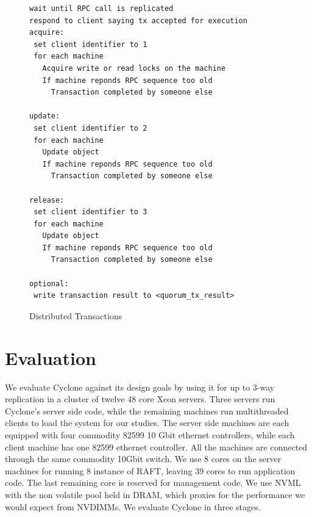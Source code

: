 \documentclass[letterpaper,twocolumn,10pt]{article}
\begin{document}
\begin{figure}
{ \scriptsize
\begin{verbatim}
wait until RPC call is replicated
respond to client saying tx accepted for execution
acquire:
 set client identifier to 1
 for each machine
   Acquire write or read locks on the machine
   If machine reponds RPC sequence too old
     Transaction completed by someone else

update:
 set client identifier to 2
 for each machine
   Update object
   If machine reponds RPC sequence too old
     Transaction completed by someone else
 
release:
 set client identifier to 3
 for each machine
   Update object
   If machine reponds RPC sequence too old
     Transaction completed by someone else

optional:
 write transaction result to <quorum_tx_result>
\end{verbatim}
}
\caption{Distributed Transactions}
\label{fig:dist_tx}
\end{figure}

\section{Evaluation}
We evaluate Cyclone against its design goals by using it for up to 3-way
replication in a cluster of twelve 48 core Xeon servers. Three servers run
Cyclone's server side code, while the remaining machines run multithreaded
clients to load the system for our studies. The server side machines are each
equipped with four commodity 82599 10 Gbit ethernet controllers, while each
client machine has one 82599 ethernet controller. All the machines are connected
through the same commodity 10Gbit switch. We use 8 cores on the server machines
for running 8 instance of RAFT, leaving 39 cores to run application code. The
last remaining core is reserved for management code. We use NVML with the non
volatile pool held in DRAM, which proxies for the performance we would expect
from NVDIMMs. We evaluate Cyclone in three stages.
\end{document}
